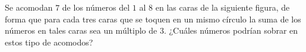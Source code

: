 Se acomodan $7$ de los números del $1$ al $8$ en las caras de la siguiente figura, de forma que para cada tres caras que se toquen en un mismo círculo la suma de los números en tales caras sea un múltiplo de $3$. ¿Cuáles números podrían sobrar en estos tipo de acomodos?